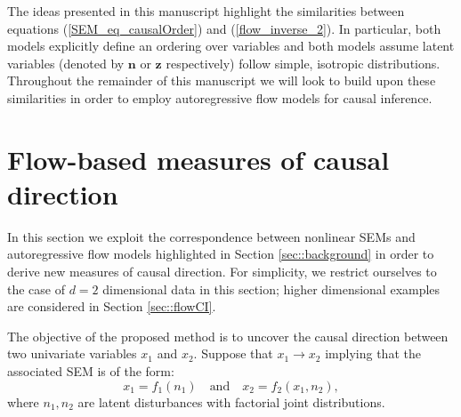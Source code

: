 \documentclass{article}
\begin{document}
The ideas presented in this manuscript 
highlight the similarities between 
equations (\ref{SEM_eq_causalOrder}) and (\ref{flow_inverse_2}). 
In particular, both models explicitly define an ordering over variables
and 
both models assume 
latent variables (denoted by $\textbf{n}$ or 
 $\textbf{z}$ respectively)
 follow simple, isotropic distributions. 
%
Throughout the remainder of this manuscript we will look to 
build upon these similarities in order to employ
autoregressive flow models for causal inference. 


\section{Flow-based measures of causal direction}
\label{sec::flowCD}

In this section we exploit the correspondence between nonlinear SEMs 
and 
autoregressive flow models highlighted in 
Section \ref{sec::background} in order to derive new measures of causal direction. 
For simplicity, we restrict ourselves to the case of $d=2$ dimensional data in this section; higher 
dimensional examples are considered in Section \ref{sec::flowCI}. 

The objective of the 
proposed method is  to uncover the causal direction between two univariate variables 
${x}_1$ and ${x}_2$. 
Suppose that ${x}_1 \rightarrow {x}_2$ implying that 
the associated SEM is of the form:
\begin{equation}
{x}_1 = f_1( n_1 ) ~~~ \mbox{ and } ~~~ {x}_2 = f_2({x}_1, n_2),
\label{bivariate_eq2}
\end{equation}
where $n_1, n_2$ are %
latent disturbances with factorial joint distributions. 
\end{document}
